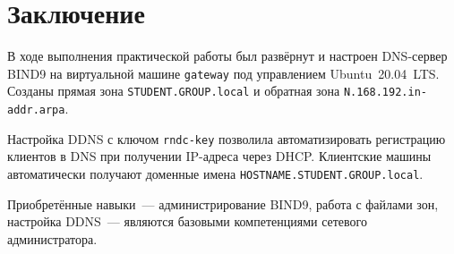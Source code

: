\section*{Заключение}

В ходе выполнения практической работы был развёрнут и настроен DNS-сервер BIND9 на виртуальной машине \texttt{gateway} под управлением Ubuntu~20.04~LTS. Созданы прямая зона \texttt{STUDENT.GROUP.local} и обратная зона \texttt{N.168.192.in-addr.arpa}.

Настройка DDNS с ключом \texttt{rndc-key} позволила автоматизировать регистрацию клиентов в DNS при получении IP-адреса через DHCP. Клиентские машины автоматически получают доменные имена \texttt{HOSTNAME.STUDENT.GROUP.local}.

Приобретённые навыки~--- администрирование BIND9, работа с файлами зон, настройка DDNS~--- являются базовыми компетенциями сетевого администратора.
